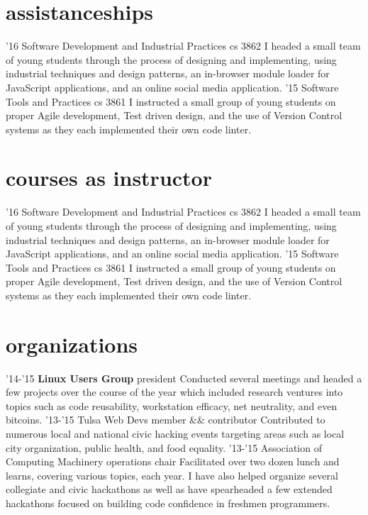 \documentclass[print]{friggeri-cv}
\begin{document}
  \section{assistanceships}

    \begin{entrylist}
      \entry
        {'16}
        {Software Development and Industrial Practices}
        {cs 3862}
        {I headed a small team of young students through the process of designing and implementing, using industrial techniques and design patterns, an in-browser module loader for JavaScript applications, and an online social media application.}
      \entry
        {'15}
        {Software Tools and Practices}
        {cs 3861}
        {I instructed a small group of young students on proper Agile development, Test driven design, and the use of Version Control systems as they each implemented their own code linter.}
    \end{entrylist}

  \section{courses as instructor}

    \begin{entrylist}
      \entry
        {'16}
        {Software Development and Industrial Practices}
        {cs 3862}
        {I headed a small team of young students through the process of designing and implementing, using industrial techniques and design patterns, an in-browser module loader for JavaScript applications, and an online social media application.}
      \entry
        {'15}
        {Software Tools and Practices}
        {cs 3861}
        {I instructed a small group of young students on proper Agile development, Test driven design, and the use of Version Control systems as they each implemented their own code linter.}
    \end{entrylist}

  \section{organizations}

    \begin{entrylist}
      \entry
        {'14-'15}
        {\textbf{Linux Users Group}}
        {president}
        {Conducted several meetings and headed a few projects over the course of the year which included research ventures into topics such as code reusability, workstation efficacy, net neutrality, and even bitcoins.}
      \entry
        {'13-'15}
        {Tulsa Web Devs}
        {member \&\& contributor}
        {Contributed to numerous local and national civic hacking events targeting areas such as local city organization, public health, and food equality.}
      \entry
        {'13-'15}
        {Association of Computing Machinery}
        {operations chair}
        {Facilitated over two dozen lunch and learns, covering various topics, each year. I have also helped organize several collegiate and civic hackathons as well as have spearheaded a few extended hackathons focused on building code confidence in freshmen programmers.}
    \end{entrylist}
\end{document}
